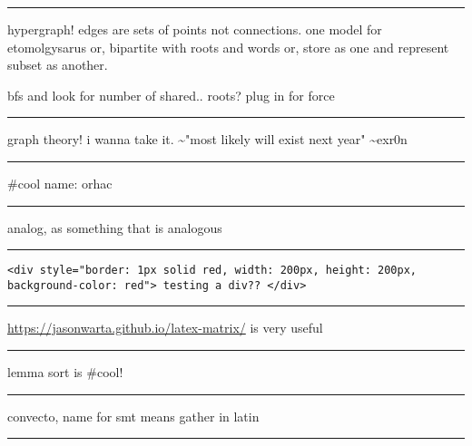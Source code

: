 \documentclass[letterpaper]{article}
\begin{document}
\noindent\rule{\textwidth}{0.5pt}

hypergraph! edges are sets of points not connections. one model for
etomolgysarus or, bipartite with roots and words or, store as one and
represent subset as another.

bfs and look for number of shared.. roots? plug in for force

\noindent\rule{\textwidth}{0.5pt}

graph theory! i wanna take it. \textasciitilde{}"most likely will exist next year"
\textasciitilde{}exr0n

\noindent\rule{\textwidth}{0.5pt}

\#cool name: orhac

\noindent\rule{\textwidth}{0.5pt}

analog, as something that is analogous

\noindent\rule{\textwidth}{0.5pt}

\begin{verbatim}
<div style="border: 1px solid red, width: 200px, height: 200px, background-color: red"> testing a div?? </div>
\end{verbatim}

\noindent\rule{\textwidth}{0.5pt}

\url{https://jasonwarta.github.io/latex-matrix/} is very useful

\noindent\rule{\textwidth}{0.5pt}

lemma sort is \#cool!

\noindent\rule{\textwidth}{0.5pt}

convecto, name for smt means gather in latin

\noindent\rule{\textwidth}{0.5pt}
\end{document}
